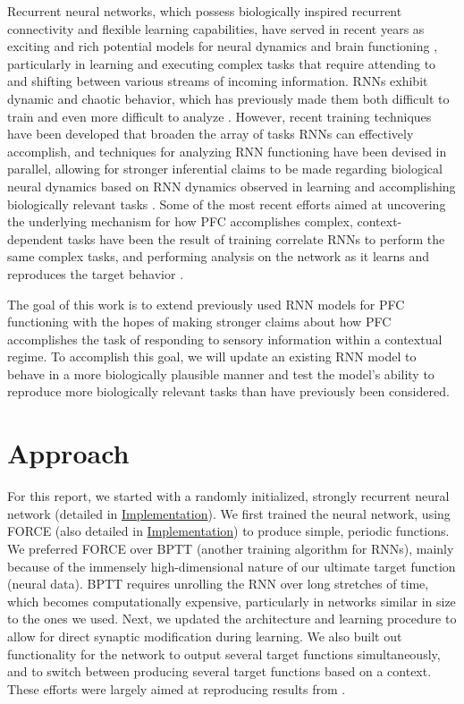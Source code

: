 \documentclass[12pt,a4paper,final]{iopart}
\begin{document}
Recurrent neural networks, which possess biologically inspired recurrent connectivity and flexible learning capabilities, have served in recent years as exciting and rich potential models for neural dynamics and brain functioning \cite{Rajan,Mante2013,BarakSussillo,Miconi,Williams}, particularly in learning and executing complex tasks that require attending to and shifting between various streams of incoming information. RNNs exhibit dynamic and chaotic behavior, which has previously made them both difficult to train and even more difficult to analyze \cite{Sussillo, Abarbanel}. However, recent training techniques have been developed that broaden the array of tasks RNNs can effectively accomplish, and techniques for analyzing RNN functioning have been devised in parallel, allowing for stronger inferential claims to be made regarding biological neural dynamics based on RNN dynamics observed in learning and accomplishing biologically relevant tasks \cite{Sussillo}. Some of the most recent efforts aimed at uncovering the underlying mechanism for how PFC accomplishes complex, context-dependent tasks have been the result of training correlate RNNs to perform the same complex tasks, and performing analysis on the network as it learns and reproduces the target behavior \cite{Mante2013}.

The goal of this work is to extend previously used RNN models for PFC functioning with the hopes of making stronger claims about how PFC accomplishes the task of responding to sensory information within a contextual regime. To accomplish this goal, we will update an existing RNN model to behave in a more biologically plausible manner and test the model's ability to reproduce more biologically relevant tasks than have previously been considered.

\section{Approach}
\label{sec:app}
For this report, we started with a randomly initialized, strongly recurrent neural network (detailed in \hyperref[sec:imp]{Implementation}). We first trained the neural network, using FORCE (also detailed in \hyperref[sec:imp]{Implementation}) to produce simple, periodic functions. We preferred FORCE over BPTT (another training algorithm for RNNs), mainly because of the immensely high-dimensional nature of our ultimate target function (neural data). BPTT requires unrolling the RNN over long stretches of time, which becomes computationally expensive, particularly in networks similar in size to the ones we used. Next, we updated the architecture and learning procedure to allow for direct synaptic modification during learning. We also built out functionality for the network to output several target functions simultaneously, and to switch between producing several target functions based on a context. These efforts were largely aimed at reproducing results from \cite{Sussillo}.
\end{document}
